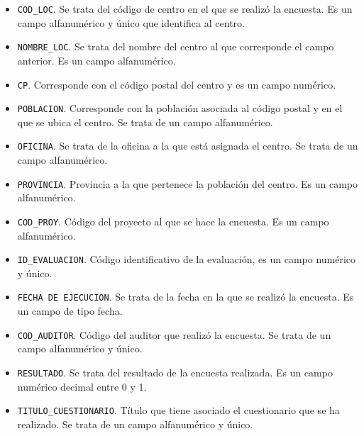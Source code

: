 \begin{itemize}
 \item \texttt{COD\_LOC}. Se trata del código de centro en el que se realizó la encuesta. Es un campo alfanumérico y único que identifica al centro.
 \item \texttt{NOMBRE\_LOC}. Se trata del nombre del centro al que corresponde el campo anterior. Es un campo alfanumérico.
 \item \texttt{CP}. Corresponde con el código postal del centro y es un campo numérico.
 \item \texttt{POBLACION}. Corresponde con la población asociada al código postal y en el que se ubica el centro. Se trata de un campo alfanumérico.
 \item \texttt{OFICINA}. Se trata de la oficina a la que está asignada el centro. Se trata de un campo alfanumérico.
 \item \texttt{PROVINCIA}. Provincia a la que pertenece la población del centro. Es un campo alfanumérico.
 \item \texttt{COD\_PROY}. Código del proyecto al que se hace la encuesta. Es un campo alfanumérico.
 \item \texttt{ID\_EVALUACION}. Código identificativo de la evaluación, es un campo numérico y único.
 \item \texttt{FECHA DE EJECUCION}. Se trata de la fecha en la que se realizó la encuesta. Es un campo de tipo fecha.
 \item \texttt{COD\_AUDITOR}. Código del auditor que realizó la encuesta. Se trata de un campo alfanumérico y único.
 \item \texttt{RESULTADO}. Se trata del resultado de la encuesta realizada. Es un campo numérico decimal entre 0 y 1.
 \item \texttt{TITULO\_CUESTIONARIO}. Título que tiene asociado el cuestionario que se ha realizado. Se trata de un campo alfanumérico y único.
\end{itemize}
